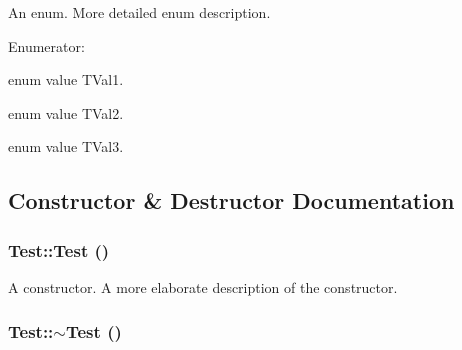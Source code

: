 An enum. More detailed enum description. \begin{Desc}
\item[Enumerator: ]\par
\begin{description}
\item[{\em 
\hypertarget{classTest_ad8d13fe56b896633273087859b89a1a3abf8059769020a35c76df3d8b02521273}{
TVal1}
\label{classTest_ad8d13fe56b896633273087859b89a1a3abf8059769020a35c76df3d8b02521273}
}]enum value TVal1. \item[{\em 
\hypertarget{classTest_ad8d13fe56b896633273087859b89a1a3a38ab2f54365cee5e5561b04f32f053e3}{
TVal2}
\label{classTest_ad8d13fe56b896633273087859b89a1a3a38ab2f54365cee5e5561b04f32f053e3}
}]enum value TVal2. \item[{\em 
\hypertarget{classTest_ad8d13fe56b896633273087859b89a1a3ad63507e26f2168659722f1ef575b50b2}{
TVal3}
\label{classTest_ad8d13fe56b896633273087859b89a1a3ad63507e26f2168659722f1ef575b50b2}
}]enum value TVal3. \end{description}
\end{Desc}



\subsection{Constructor \& Destructor Documentation}
\hypertarget{classTest_a99f2bbfac6c95612322b0f10e607ebe5}{
\subsubsection[{Test}]{\setlength{\rightskip}{0pt plus 5cm}Test::Test ()}}
\label{classTest_a99f2bbfac6c95612322b0f10e607ebe5}


A constructor. A more elaborate description of the constructor. \hypertarget{classTest_a2b0a62f1e667bbe8d8cb18d785bfa991}{
\subsubsection[{$\sim$Test}]{\setlength{\rightskip}{0pt plus 5cm}Test::$\sim$Test ()}}
\label{classTest_a2b0a62f1e667bbe8d8cb18d785bfa991}



